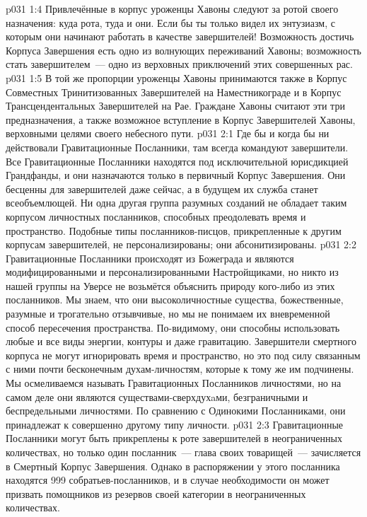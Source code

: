 \vs p031 1:4 Привлечённые в корпус уроженцы Хавоны следуют за ротой своего назначения: куда рота, туда и они. Если бы ты только видел их энтузиазм, с которым они начинают работать в качестве завершителей! Возможность достичь Корпуса Завершения есть одно из волнующих переживаний Хавоны; возможность стать завершителем~--- одно из верховных приключений этих совершенных рас.
\vs p031 1:5 В той же пропорции уроженцы Хавоны принимаются также в Корпус Совместных Тринитизованных Завершителей на Наместникограде и в Корпус Трансцендентальных Завершителей на Рае. Граждане Хавоны считают эти три предназначения, а также возможное вступление в Корпус Завершителей Хавоны, верховными целями своего небесного пути.
\vs p031 2:1 Где бы и когда бы ни действовали Гравитационные Посланники, там всегда командуют завершители. Все Гравитационные Посланники находятся под исключительной юрисдикцией Грандфанды, и они назначаются только в первичный Корпус Завершения. Они бесценны для завершителей даже сейчас, а в будущем их служба станет всеобъемлющей. Ни одна другая группа разумных созданий не обладает таким корпусом личностных посланников, способных преодолевать время и пространство. Подобные типы посланников\hyp{}писцов, прикрепленные к другим корпусам завершителей, не персонализированы; они абсонитизированы.
\vs p031 2:2 \pc Гравитационные Посланники происходят из Божеграда и являются модифицированными и персонализированными Настройщиками, но никто из нашей группы на Уверсе не возьмётся объяснить природу кого\hyp{}либо из этих посланников. Мы знаем, что они высоколичностные существа, божественные, разумные и трогательно отзывчивые, но мы не понимаем их вневременной способ пересечения пространства. По\hyp{}видимому, они способны использовать любые и все виды энергии, контуры и даже гравитацию. Завершители смертного корпуса не могут игнорировать время и пространство, но это под силу связанным с ними почти бесконечным духам\hyp{}личностям, которые к тому же им подчинены. Мы осмеливаемся называть Гравитационных Посланников личностями, но на самом деле они являются существами\hyp{}сверхдухaми, безграничными и беспредельными личностями. По сравнению с Одинокими Посланниками, они принадлежат к совершенно другому типу личности.
\vs p031 2:3 \pc Гравитационные Посланники могут быть прикреплены к роте завершителей в неограниченных количествах, но только один посланник~--- глава своих товарищей~--- зачисляется в Смертный Корпус Завершения. Однако в распоряжении у этого посланника находятся 999 собратьев\hyp{}посланников, и в случае необходимости он может призвать помощников из резервов своей категории в неограниченных количествах.

